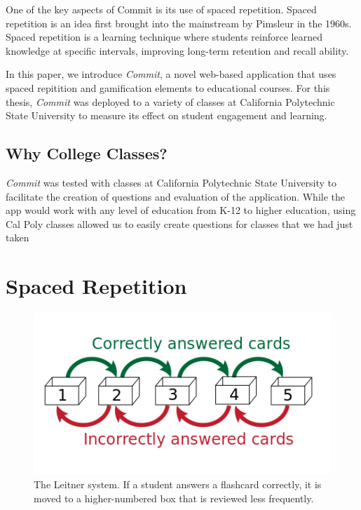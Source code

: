  One of the key aspects of Commit is its use of spaced repetition. Spaced repetition is an idea first brought into the mainstream by Pimsleur in the 1960s. Spaced repetition is a learning technique where students reinforce learned knowledge at specific intervals, improving long-term retention and recall ability.


\par In this paper, we introduce \textit{Commit}, a novel web-based application that uses spaced repitition and gamification elements to educational courses. For this thesis, \textit{Commit} was deployed to a variety of classes at California Polytechnic State University to measure its effect on student engagement and learning.

\subsection{Why College Classes?}
\par \textit{Commit} was tested with classes at California Polytechnic State University to facilitate the creation of questions and evaluation of the application. While the app would work with any level of education from K-12 to higher education, using Cal Poly classes allowed us to easily create questions for classes that we had just taken


\section{Spaced Repetition}
\begin{figure}[h]
	\includegraphics{figures/leitner}
	\caption{The Leitner system. If a student answers a flashcard correctly, it is moved to a higher-numbered box that is reviewed less frequently.}
	\label{fig:leitner}
\end{figure}

